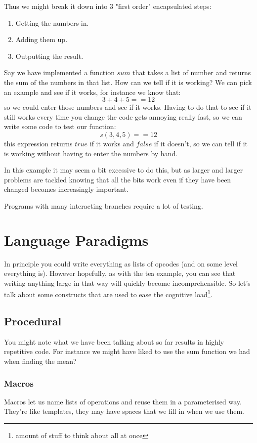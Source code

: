 \documentclass{article}
\begin{document}
Thus we might break it down into 3 "first order" encapsulated steps:
\begin{enumerate}
\item Getting the numbers in.
\item Adding them up.
\item Outputting the result.
\end{enumerate}

Say we have implemented a function $sum$ that takes a list of number and
returns the sum of the numbers in that list. How can we tell if it is working?
We can pick an example and see if it works, for instance we know that:
\begin{displaymath}
3 + 4 + 5 == 12
\end{displaymath}
so we could enter those numbers and see if it works. Having to do that to see
if it still works every time you change the code gets annoying really fast, so
we can write some code to test our function:
\begin{displaymath}
s(3, 4, 5) ==  12
\end{displaymath}
this expression returns $true$ if it works and $false$ if it doesn't, so we can
tell if it is working without having to enter the numbers by hand.

In this example it may seem a bit excessive to do this, but as larger and
larger problems are tackled knowing that all the bits work even if they have
been changed becomes increasingly important.

Programs with many interacting branches require a lot of testing.

\section{Language Paradigms}
In principle you could write everything as lists of opcodes (and on some level
everything is). However hopefully, as with the tea example, you can see that
writing anything large in that way will quickly become incomprehensible.
So let's talk about some constructs that are used to ease the cognitive
load\footnote{amount of stuff to think about all at once}.
\subsection{Procedural}
You might note what we have been talking about so far results in highly
repetitive code.  For instance we might have liked to use the sum function we
had when finding the mean?
\subsubsection{Macros}
Macros let us name lists of operations and reuse them in a parameterised way.
They're like templates, they may have spaces that we fill in when we use them.
\end{document}
